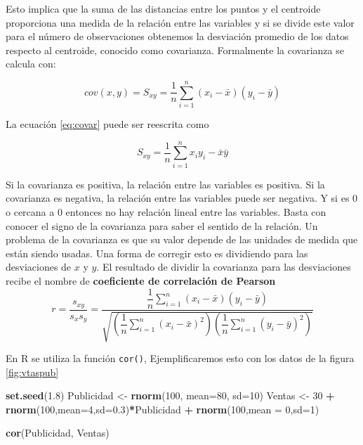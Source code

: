 \documentclass[letterpaper,]{book}
\newenvironment{Shaded}{\begin{snugshade}}{\end{snugshade}}
\newcommand{\DataTypeTok}[1]{\textcolor[rgb]{0.13,0.29,0.53}{#1}}
\newcommand{\DecValTok}[1]{\textcolor[rgb]{0.00,0.00,0.81}{#1}}
\newcommand{\FloatTok}[1]{\textcolor[rgb]{0.00,0.00,0.81}{#1}}
\newcommand{\KeywordTok}[1]{\textcolor[rgb]{0.13,0.29,0.53}{\textbf{#1}}}
\newcommand{\NormalTok}[1]{#1}
\newcommand{\OperatorTok}[1]{\textcolor[rgb]{0.81,0.36,0.00}{\textbf{#1}}}
\newcommand{\StringTok}[1]{\textcolor[rgb]{0.31,0.60,0.02}{#1}}
\begin{document}
Esto implica que la suma de las distancias entre los puntos y el centroide proporciona una medida de la relación entre las variables y si se divide este valor para el número de observaciones obtenemos la desviación promedio de los datos respecto al centroide, conocido como covarianza. Formalmente la covarianza se calcula con:

\begin{equation} 
  cov(x,y) = S_{xy} = \dfrac{1}{n} \sum_{i=1}^{n}\left(x_i-\bar{x}\right)\left(y_i-\bar{y}\right)
  \label{eq:covar}
\end{equation}

La ecuación \eqref{eq:covar} puede ser reescrita como

\begin{equation} 
  S_{xy} = \dfrac{1}{n}\sum_{i=1}^{n}{x_iy_i}-\bar{x}\bar{y}
  \label{eq:covar2}
\end{equation}

Si la covarianza es positiva, la relación entre las variables es positiva. Si la covarianza es negativa, la relación entre las variables puede ser negativa. Y si es \(0\) o cercana a \(0\) entonces no hay relación lineal entre las variables. Basta con conocer el signo de la covarianza para saber el sentido de la relación. Un problema de la covarianza es que su valor depende de las unidades de medida que están siendo usadas. Una forma de corregir esto es dividiendo para las desviaciones de \(x\) y \(y\). El resultado de dividir la covarianza para las desviaciones recibe el nombre de \textbf{coeficiente de correlación de Pearson}
\begin{equation} 
  r=\dfrac{s_{xy}}{s_xs_y}=\dfrac{\dfrac{1}{n} \sum_{i=1}^{n}\left(x_i-\bar{x}\right)\left(y_i-\bar{y}\right)}{\sqrt{\left(\dfrac{1}{n} \sum_{i=1}^{n}\left(x_i-\bar{x}\right)^2\right)\left(\dfrac{1}{n} \sum_{i=1}^{n}\left(y_i-\bar{y}\right)^2\right)}}
  \label{eq:covar3}
\end{equation}

En R se utiliza la función \texttt{cor()}, Ejemplificaremos esto con los datos de la figura \ref{fig:vtaspub}

\begin{Shaded}
\begin{Highlighting}[]
\KeywordTok{set.seed}\NormalTok{(}\FloatTok{1.8}\NormalTok{)}
\NormalTok{Publicidad <-}\StringTok{ }\KeywordTok{rnorm}\NormalTok{(}\DecValTok{100}\NormalTok{, }\DataTypeTok{mean=}\DecValTok{80}\NormalTok{, }\DataTypeTok{sd=}\DecValTok{10}\NormalTok{)}
\NormalTok{Ventas <-}\StringTok{ }\DecValTok{30} \OperatorTok{+}\StringTok{ }\KeywordTok{rnorm}\NormalTok{(}\DecValTok{100}\NormalTok{,}\DataTypeTok{mean=}\DecValTok{4}\NormalTok{,}\DataTypeTok{sd=}\FloatTok{0.3}\NormalTok{)}\OperatorTok{*}\NormalTok{Publicidad }\OperatorTok{+}\StringTok{ }\KeywordTok{rnorm}\NormalTok{(}\DecValTok{100}\NormalTok{,}\DataTypeTok{mean =} \DecValTok{0}\NormalTok{,}\DataTypeTok{sd=}\DecValTok{1}\NormalTok{)}

\KeywordTok{cor}\NormalTok{(Publicidad, Ventas)}
\end{Highlighting}
\end{Shaded}
\end{document}
